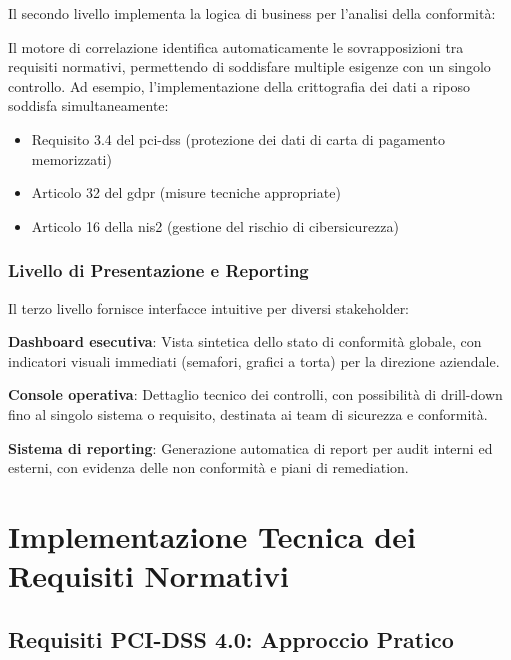 Il secondo livello implementa la logica di business per l'analisi della conformità:

Il motore di correlazione identifica automaticamente le sovrapposizioni tra requisiti normativi, permettendo di soddisfare multiple esigenze con un singolo controllo. Ad esempio, l'implementazione della crittografia dei dati a riposo soddisfa simultaneamente:
\begin{itemize}
    \item Requisito 3.4 del \gls{pci-dss} (protezione dei dati di carta di pagamento memorizzati)
    \item Articolo 32 del \gls{gdpr} (misure tecniche appropriate)
    \item Articolo 16 della \gls{nis2} (gestione del rischio di cibersicurezza)
\end{itemize}

\subsubsection{\texorpdfstring{Livello di Presentazione e Reporting}{4.3.2.3 - Livello di Presentazione e Reporting}}

Il terzo livello fornisce interfacce intuitive per diversi stakeholder:

\textbf{Dashboard esecutiva}: Vista sintetica dello stato di conformità globale, con indicatori visuali immediati (semafori, grafici a torta) per la direzione aziendale.

\textbf{Console operativa}: Dettaglio tecnico dei controlli, con possibilità di drill-down fino al singolo sistema o requisito, destinata ai team di sicurezza e conformità.

\textbf{Sistema di reporting}: Generazione automatica di report per audit interni ed esterni, con evidenza delle non conformità e piani di remediation.

\section{\texorpdfstring{Implementazione Tecnica dei Requisiti Normativi}{4.4 - Implementazione Tecnica dei Requisiti Normativi}}
\label{sec:4.4_implementazione}

\subsection{\texorpdfstring{Requisiti PCI-DSS 4.0: Approccio Pratico}{4.4.1 - Requisiti PCI-DSS 4.0: Approccio Pratico}}
\label{subsec:4.4.1_pcidss}

